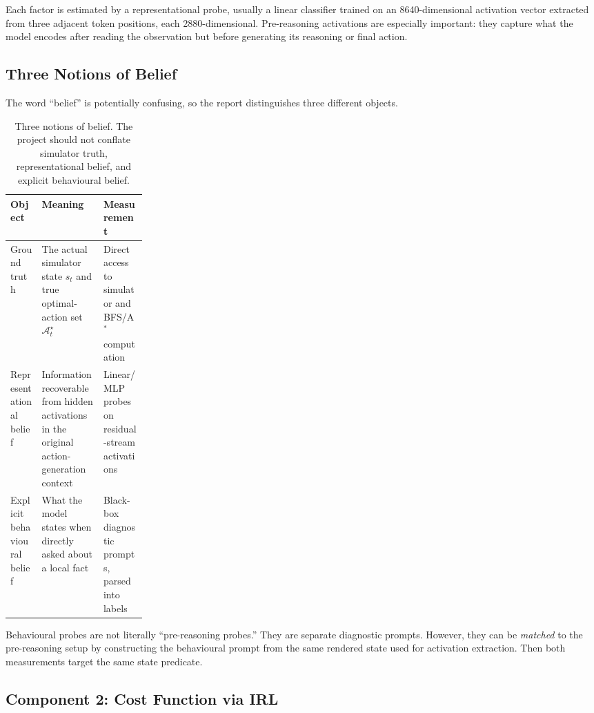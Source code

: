 \documentclass[11pt,a4paper]{article}
\newcommand{\optset}{\mathcal{A}^{\star}}
\newcommand{\Astar}{A$^*$}
\begin{document}
Each factor is estimated by a representational probe, usually a linear classifier trained on an 8640-dimensional activation vector extracted from three adjacent token positions, each 2880-dimensional. Pre-reasoning activations are especially important: they capture what the model encodes after reading the observation but before generating its reasoning or final action.

\subsection{Three Notions of Belief}

The word ``belief'' is potentially confusing, so the report distinguishes three different objects.

\begin{table}[h]
\centering
\small
\begin{tabularx}{\linewidth}{p{0.23\linewidth}X X}
\toprule
Object & Meaning & Measurement \\
\midrule
Ground truth & The actual simulator state $s_t$ and true optimal-action set $\optset_t$ & Direct access to simulator and BFS/\Astar{} computation \\
Representational belief & Information recoverable from hidden activations in the original action-generation context & Linear/MLP probes on residual-stream activations \\
Explicit behavioural belief & What the model states when directly asked about a local fact & Black-box diagnostic prompts, parsed into labels \\
\bottomrule
\end{tabularx}
\caption{Three notions of belief. The project should not conflate simulator truth, representational belief, and explicit behavioural belief.}
\label{tab:belief-types}
\end{table}

\begin{warningbox}
Behavioural probes are not literally ``pre-reasoning probes.'' They are separate diagnostic prompts. However, they can be \emph{matched} to the pre-reasoning setup by constructing the behavioural prompt from the same rendered state used for activation extraction. Then both measurements target the same state predicate.
\end{warningbox}

\subsection{Component 2: Cost Function via IRL}
\end{document}
